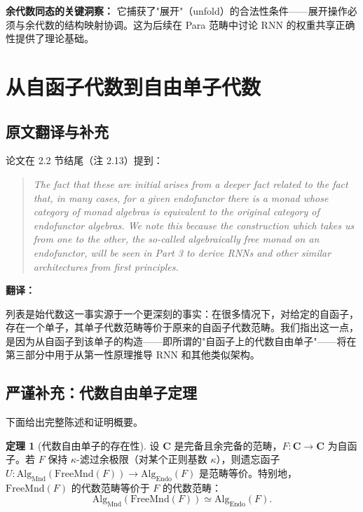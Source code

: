 \documentclass[12pt,a4paper]{ctexart}
\theoremstyle{definition}
\newtheorem{theorem}[definition]{定理}
\newcommand{\cat}[1]{\mathbf{#1}}
\newcommand{\Monad}{\mathrm{Mnd}}
\newcommand{\Alg}{\mathrm{Alg}}
\newcommand{\FreeMnd}{\mathrm{FreeMnd}}
\newcommand{\Endo}{\mathrm{Endo}}
\begin{document}
\textbf{余代数同态的关键洞察：} 它捕获了"展开"（unfold）的合法性条件——展开操作必须与余代数的结构映射协调。这为后续在 Para 范畴中讨论 RNN 的权重共享正确性提供了理论基础。

\newpage

\section{从自函子代数到自由单子代数}

\subsection{原文翻译与补充}

论文在 2.2 节结尾（注 2.13）提到：
\begin{quote}
\itshape
The fact that these are initial arises from a deeper fact related to the fact that, in many cases, for a given endofunctor there is a monad whose category of monad algebras is equivalent to the original category of endofunctor algebras. We note this because the construction which takes us from one to the other, the so-called algebraically free monad on an endofunctor, will be seen in Part 3 to derive RNNs and other similar architectures from first principles.
\end{quote}

\textbf{翻译：}

列表是始代数这一事实源于一个更深刻的事实：在很多情况下，对给定的自函子，存在一个单子，其单子代数范畴等价于原来的自函子代数范畴。我们指出这一点，是因为从自函子到该单子的构造——即所谓的"自函子上的代数自由单子"——将在第三部分中用于从第一性原理推导 RNN 和其他类似架构。

\subsection{严谨补充：代数自由单子定理}

下面给出完整陈述和证明概要。

\begin{theorem}[代数自由单子的存在性]\label{thm:free-monad}
设 $\cat C$ 是完备且余完备的范畴，$F:\cat C\to\cat C$ 为自函子。若 $F$ 保持 $\kappa$-滤过余极限（对某个正则基数 $\kappa$），则遗忘函子 $U:\Alg_{\Monad}(\FreeMnd(F))\to\Alg_{\Endo}(F)$ 是范畴等价。特别地，$\FreeMnd(F)$ 的代数范畴等价于 $F$ 的代数范畴：
\[\Alg_{\Monad}(\FreeMnd(F))\simeq\Alg_{\Endo}(F).\]
\end{theorem}
\end{document}
